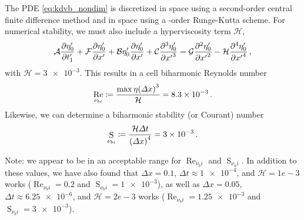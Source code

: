 \documentclass{jfm}
\DeclareMathOperator{\Reyn}{Re}
\DeclareMathOperator{\Stab}{S}
\begin{document}
The PDE \cref{eq:kdvb_nondim} is discretized in space using a
second-order central finite difference method and in space using a
-order Runge-Kutta scheme.
For numerical stability, we must also include a hyperviscosity term
$\mathcal{H}$,
\begin{equation}
  \mathcal{A} \pdv{\eta'_0}{t'_1} + \mathcal{F} \pdv{\eta'_0}{x'} + \mathcal{B}
  \eta'_0 \pdv{\eta'_0}{x'} + \mathcal{C} \pdv[3]{\eta'_0}{{x'}} =
  \mathcal{G} \pdv[2]{\eta'_0}{{x'}} - \mathcal{H}
  \pdv[4]{\eta'_0}{{x'}} \,,
\end{equation}
with $\mathcal{H} = \num{3e-3}$.
This results in a cell biharmonic Reynolds number
\begin{equation}
  \Reyn_{\nu_{bi}} \coloneqq \frac{\max{\eta} \pqty{\Delta
  x}^3}{\mathcal{H}} = \num{8.3e-3} \,.
\end{equation}
Likewise, we can determine a biharmonic stability (or Courant) number
\begin{equation}
  \Stab_{\nu_{bi}} \coloneqq \frac{\mathcal{H} \Delta t}{\pqty{\Delta
    x}^4} = \num{3e-3} \,.
\end{equation}

Note: we appear to be in an acceptable range for $\Reyn_{\nu_bi}$ and
$\Stab_{\nu_ni}$.
In addition to these values, we have also found that $\Delta x = 0.1$,
$\Delta t \approx \num{1e-4}$, and $\mathcal{H} = 1e-3$ works
($\Reyn_{\nu_bi} = 0.2$ and $\Stab_{\nu_bi} = \num{1e-3}$), as well as
$\Delta x = 0.05$, $\Delta t \approx \num{6.25e-6}$, and $\mathcal{H} =
2e-3$ works ($\Reyn_{\nu_bi} = \num{1.25e-3}$ and $\Stab_{\nu_bi} =
\num{3e-3}$).
\end{document}
